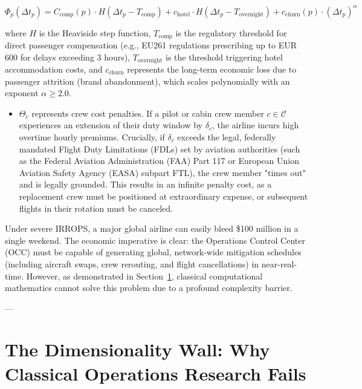 \documentclass[11pt,a4paper]{book}
\begin{document}
\begin{equation}
\Phi_p\left(\Delta t_p\right) = C_{\text{comp}}(p) \cdot H\left(\Delta t_p - T_{\text{comp}}\right) + c_{\text{hotel}} \cdot H\left(\Delta t_p - T_{\text{overnight}}\right) + c_{\text{churn}}(p) \cdot \left(\Delta t_p\right)^\alpha
\end{equation}

where $H$ is the Heaviside step function, $T_{\text{comp}}$ is the regulatory threshold for direct passenger compensation (e.g., EU261 regulations prescribing up to EUR {600} for delays exceeding 3 hours), $T_{\text{overnight}}$ is the threshold triggering hotel accommodation costs, and $c_{\text{churn}}$ represents the long-term economic loss due to passenger attrition (brand abandonment), which scales polynomially with an exponent $\alpha \ge 2.0$.

\begin{itemize}
    \item $\Theta_c$ represents crew cost penalties. If a pilot or cabin crew member $c \in \mathcal{C}$ experiences an extension of their duty window by $\delta_c$, the airline incurs high overtime hourly premiums. Crucially, if $\delta_c$ exceeds the legal, federally mandated Flight Duty Limitations (FDLs) set by aviation authorities (such as the Federal Aviation Administration (FAA) Part 117 or European Union Aviation Safety Agency (EASA) subpart FTL), the crew member "times out" and is legally grounded. This results in an infinite penalty cost, as a replacement crew must be positioned at extraordinary expense, or subsequent flights in their rotation must be canceled.
\end{itemize}

Under severe IRROPS, a major global airline can easily bleed \$100 million in a single weekend. The economic imperative is clear: the Operations Control Center (OCC) must be capable of generating global, network-wide mitigation schedules (including aircraft swaps, crew rerouting, and flight cancellations) in near-real-time. However, as demonstrated in Section~\ref{sec:dimensionality_wall}, classical computational mathematics cannot solve this problem due to a profound complexity barrier.

---

\section{The Dimensionality Wall: Why Classical Operations Research Fails}\label{sec:dimensionality_wall}
\end{document}
